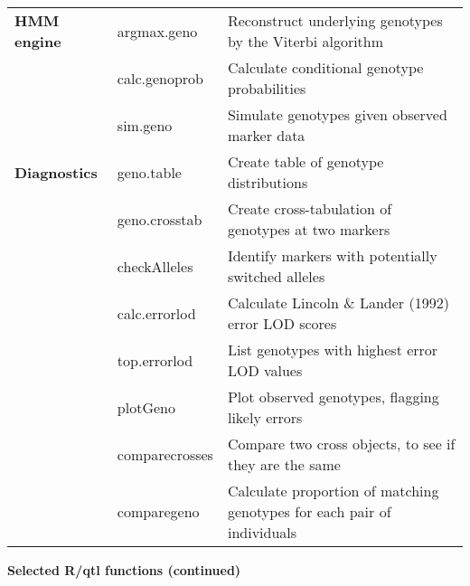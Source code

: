\documentclass[10pt,letterpaper]{article}
\begin{document}
\begin{tabular}{lll}
\textbf{HMM engine} 
& argmax.geno & Reconstruct underlying genotypes by the Viterbi
algorithm \\ 
& calc.genoprob & Calculate conditional genotype probabilities \\ 
& sim.geno & Simulate genotypes given observed marker data \\ 
\hline

\textbf{Diagnostics} 
& geno.table & Create table of genotype distributions \\ 
& geno.crosstab & Create cross-tabulation of genotypes at two markers \\
& checkAlleles & Identify markers with potentially switched alleles \\
& calc.errorlod & Calculate Lincoln \& Lander (1992) error LOD scores \\
& top.errorlod & List genotypes with highest error LOD values \\ 
& plotGeno & Plot observed genotypes, flagging likely errors \\ 
& comparecrosses & Compare two cross objects, to see if they are the same \\
& comparegeno & Calculate proportion of matching genotypes for each
pair of individuals \\
\hline

\end{tabular}

\newpage

\noindent \textbf{Selected R/qtl functions (continued)} 
\end{document}
